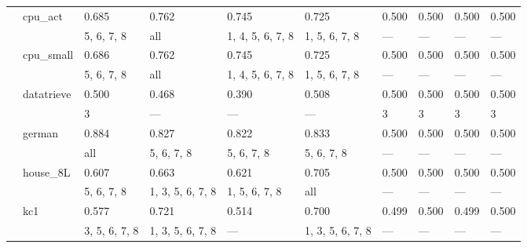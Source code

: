 \documentclass{article}
\begin{document}
\begin{center}
\begin{longtable}{p{1.2cm}p{1.8cm}p{1cm}p{1cm}p{1cm}p{1cm}p{1cm}p{1cm}p{1cm}p{1cm}}
             & cpu\_act      & 0.685            & 0.762            & 0.745            & 0.725            & 0.500            & 0.500            & 0.500            & 0.500            \\
             &              & 5, 6, 7, 8       & all              & 1, 4, 5, 6, 7, 8 & 1, 5, 6, 7, 8    & ---              & ---              & ---              & ---              \\
             & cpu\_small    & 0.686            & 0.762            & 0.745            & 0.725            & 0.500            & 0.500            & 0.500            & 0.500            \\
             &              & 5, 6, 7, 8       & all              & 1, 4, 5, 6, 7, 8 & 1, 5, 6, 7, 8    & ---              & ---              & ---              & ---              \\
             & datatrieve   & 0.500            & 0.468            & 0.390            & 0.508            & 0.500            & 0.500            & 0.500            & 0.500            \\
             &              & 3                & ---              & ---              & ---              & 3                & 3                & 3                & 3                \\
             & german       & 0.884            & 0.827            & 0.822            & 0.833            & 0.500            & 0.500            & 0.500            & 0.500            \\
             &              & all              & 5, 6, 7, 8       & 5, 6, 7, 8       & 5, 6, 7, 8       & ---              & ---              & ---              & ---              \\
             & house\_8L     & 0.607            & 0.663            & 0.621            & 0.705            & 0.500            & 0.500            & 0.500            & 0.500            \\
             &              & 5, 6, 7, 8       & 1, 3, 5, 6, 7, 8 & 1, 5, 6, 7, 8    & all              & ---              & ---              & ---              & ---              \\
             & kc1          & 0.577            & 0.721            & 0.514            & 0.700            & 0.499            & 0.500            & 0.499            & 0.500            \\
             &              & 3, 5, 6, 7, 8    & 1, 3, 5, 6, 7, 8 & ---              & 1, 3, 5, 6, 7, 8 & ---              & ---              & ---              & ---              \\

\end{longtable}
\end{center}
\end{document}
